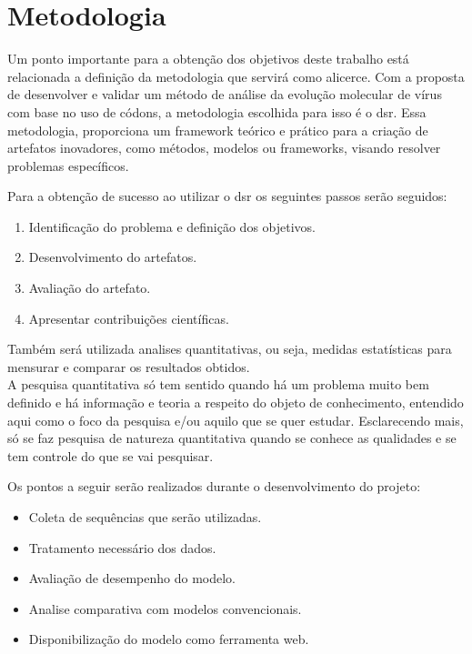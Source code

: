 \chapter{Metodologia}

Um ponto importante para a obtenção dos objetivos deste trabalho está relacionada a definição da metodologia que servirá como alicerce. Com a proposta de desenvolver e validar um método de análise da evolução molecular de vírus com base no uso de códons, a metodologia escolhida para isso é o \ac{dsr}. Essa metodologia, proporciona um framework teórico e prático para a criação de artefatos inovadores, como métodos, modelos ou frameworks, visando resolver problemas específicos.\cite{peffers_dsr_2007}

Para a obtenção de sucesso ao utilizar o \ac{dsr} os seguintes passos serão seguidos:
\begin{enumerate}
  \item Identificação do problema e definição dos objetivos.
  \item Desenvolvimento do artefatos.
  \item Avaliação do artefato.
  \item Apresentar contribuições científicas.
\end{enumerate}

Também será utilizada analises quantitativas, ou seja, medidas estatísticas para mensurar e comparar os resultados obtidos.\\
A pesquisa quantitativa só tem sentido quando há um problema muito bem definido e há informação e teoria a respeito do objeto de conhecimento, entendido aqui como o foco da pesquisa e/ou aquilo que se quer estudar. Esclarecendo mais, só se faz pesquisa de natureza quantitativa quando se conhece as qualidades e se tem controle do que se vai pesquisar.\cite{da_silva_pesquisa_2014}

Os pontos a seguir serão realizados durante o desenvolvimento do projeto:
\begin{itemize}
  \item Coleta de sequências que serão utilizadas.
  \item Tratamento necessário dos dados.
  \item Avaliação de desempenho do modelo.
  \item Analise comparativa com modelos convencionais.
  \item Disponibilização do modelo como ferramenta web.
\end{itemize}

